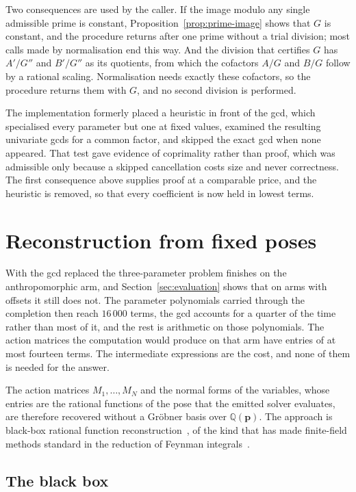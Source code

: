 \documentclass[11pt,a4paper]{article}
\theoremstyle{plain}
\theoremstyle{definition}
\theoremstyle{remark}
\newcommand{\QQ}{\mathbb{Q}}
\newcommand{\bp}{\boldsymbol{p}}
\begin{document}
Two consequences are used by the caller. If the image modulo any single admissible prime is constant,
Proposition~\ref{prop:prime-image} shows that $G$ is constant, and the procedure returns after one prime
without a trial division; most calls made by normalisation end this way. And the division that certifies
$G$ has $A'/G''$ and $B'/G''$ as its quotients, from which the cofactors $A/G$ and $B/G$ follow by a
rational scaling. Normalisation needs exactly these cofactors, so the procedure returns them with $G$,
and no second division is performed.

The implementation formerly placed a heuristic in front of the gcd, which specialised every
parameter but one at fixed values, examined the resulting univariate gcds for a common factor, and
skipped the exact gcd when none appeared. That test gave evidence of coprimality rather than proof,
which was admissible only because a skipped cancellation costs size and never correctness. The first
consequence above supplies proof at a comparable price, and the heuristic is removed, so that every
coefficient is now held in lowest terms.

\section{Reconstruction from fixed poses}
\label{sec:reconstruction}

With the gcd replaced the three-parameter problem finishes on the anthropomorphic arm, and
Section~\ref{sec:evaluation} shows that on arms with offsets it still does not. The parameter
polynomials carried through the completion then reach $16\,000$ terms, the gcd accounts for a quarter
of the time rather than most of it, and the rest is arithmetic on those polynomials. The action
matrices the computation would produce on that arm have entries of at most fourteen terms. The
intermediate expressions are the cost, and none of them is needed for the answer.

The action matrices $M_1,\dots,M_N$ and the normal forms of the variables, whose entries are the
rational functions of the pose that the emitted solver evaluates, are therefore recovered without a
Gr\"obner basis over $\QQ(\bp)$. The approach is black-box rational function
reconstruction~\cite{kaltofen1990}, of the kind that has made finite-field methods standard in the
reduction of Feynman integrals~\cite{vonmanteuffel2015,peraro2016}.

\subsection{The black box}
\end{document}

